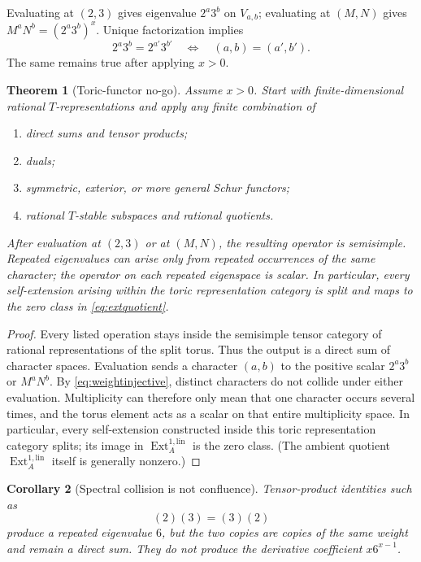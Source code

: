 \documentclass[11pt,oneside]{article}
\newtheorem{theorem}{Theorem}[section]
\newtheorem{corollary}[theorem]{Corollary}
\theoremstyle{definition}
\theoremstyle{remark}
\newcommand{\Ext}{\operatorname{Ext}}
\begin{document}
Evaluating at $(2,3)$ gives eigenvalue $2^a3^b$ on $V_{a,b}$; evaluating at $(M,N)$ gives
$M^aN^b=(2^a3^b)^x$.  Unique factorization implies
\begin{equation}
 2^a3^b=2^{a'}3^{b'}
 \quad\Longleftrightarrow\quad
 (a,b)=(a',b').
 \label{eq:weightinjective}
\end{equation}
The same remains true after applying $x>0$.

\begin{theorem}[Toric-functor no-go]
\label{thm:toricnogo}
Assume $x>0$.  Start with finite-dimensional rational $T$-representations and apply any finite combination of
\begin{enumerate}
\item direct sums and tensor products;
\item duals;
\item symmetric, exterior, or more general Schur functors;
\item rational $T$-stable subspaces and rational quotients.
\end{enumerate}
After evaluation at $(2,3)$ or at $(M,N)$, the resulting operator is semisimple.  Repeated
eigenvalues can arise only from repeated occurrences of the same character; the operator on
each repeated eigenspace is scalar.  In particular, every self-extension arising within the
toric representation category is split and maps to the zero class in
\eqref{eq:extquotient}.
\end{theorem}

\begin{proof}
Every listed operation stays inside the semisimple tensor category of rational representations
of the split torus.  Thus the output is a direct sum of character spaces.  Evaluation sends a
character $(a,b)$ to the positive scalar $2^a3^b$ or $M^aN^b$.  By
\eqref{eq:weightinjective}, distinct characters do not collide under either evaluation.
Multiplicity can therefore only mean that one character occurs several times, and the torus
element acts as a scalar on that entire multiplicity space.  In particular, every
self-extension constructed inside this toric representation category splits; its image in
$\Ext_A^{1,\mathrm{lin}}$ is the zero class.  (The ambient quotient
$\Ext_A^{1,\mathrm{lin}}$ itself is generally nonzero.)
\end{proof}

\begin{corollary}[Spectral collision is not confluence]
\label{cor:collisionnotconfluence}
Tensor-product identities such as
\[
 (2)(3)=(3)(2)
\]
produce a repeated eigenvalue $6$, but the two copies are copies of the same weight and remain
a direct sum.  They do not produce the derivative coefficient $x6^{x-1}$.
\end{corollary}
\end{document}
